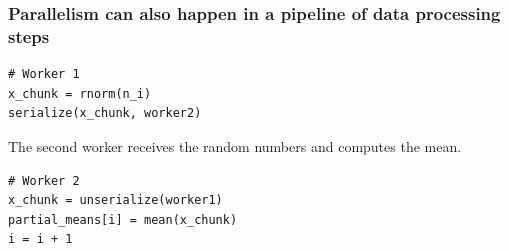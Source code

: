 \documentclass{beamer}
\begin{document}
\begin{frame}[fragile]

    \frametitle{Parallelism can also happen in a pipeline of data
    processing steps}

\begin{verbatim}
# Worker 1
x_chunk = rnorm(n_i)
serialize(x_chunk, worker2)
\end{verbatim}

The second worker receives the random numbers and computes the mean.

\begin{verbatim}
# Worker 2
x_chunk = unserialize(worker1)
partial_means[i] = mean(x_chunk)
i = i + 1
\end{verbatim}

\end{frame}
\end{document}

